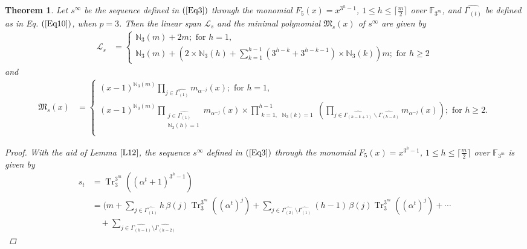 \documentclass[pdflatex,sn-mathphys-num]{sn-jnl}%
\theoremstyle{thmstyleone}%
\newtheorem{theorem}{Theorem}%
\theoremstyle{thmstyletwo}%
\theoremstyle{thmstylethree}%
\begin{document}
\begin{theorem}\label{Th3}
    Let $s^{\infty}$ be the sequence defined in $(\ref{Eq3})$ through the monomial $F_{5}(x)=x^{3^h-1}$, $1\leq h\leq\lceil\frac{m}{2}\rceil$ over $\mathbb{F}_{3^m}$, and $\widehat{\Gamma_{(t)}}$ be defined as in Eq. $(\ref{Eq10})$, when $p=3$. Then the linear span $\mathcal{L}_{s}$ and the minimal polynomial $\mathfrak{M}_{s}(x)$ of $s^{\infty}$ are given by
    \begin{align*}
        \mathcal{L}_{s} &=\begin{cases}
            \mathbb{N}_{3}(m)+2m;\text{ for }h=1, \\
            \mathbb{N}_{3}(m)+\left(2\times\mathbb{N}_{3}(h)+\sum_{k=1}^{h-1}(3^{h-k}+3^{h-k-1})\times\mathbb{N}_{3}(k)\right) m;\text{ for }h\geq 2
        \end{cases}    
    \end{align*}
    and
    \begin{align*}
        \mathfrak{M}_{s}(x) &= \begin{cases}
            (x-1)^{\mathbb{N}_{3}(m)}\prod_{j\in\widehat{\Gamma_{(1)}}}m_{\alpha^{-j}}(x);\text{ for }h=1, \\
            (x-1)^{\mathbb{N}_{3}(m)}\prod_{\substack{j\in\widehat{\Gamma_{(1)}}\\\mathbb{N}_{3}(h)=1}}m_{\alpha^{-j}}(x)\times \prod_{\substack{k=1,\text{ }\mathbb{N}_{3}(k)=1}}^{h-1}\left(\prod_{j\in\widehat{\Gamma_{(h-k+1)}}\backslash\widehat{\Gamma_{(h-k)}}}m_{\alpha^{-j}}(x)\right);\text{ for }h\geq 2. \\
        \end{cases}
    \end{align*}
    \begin{proof}
        With the aid of Lemma $\ref{L12}$, the sequence $s^{\infty}$ defined in $(\ref{Eq3})$ through the monomial $F_{5}(x)=x^{3^h-1}$, $1\leq h\leq\lceil\frac{m}{2}\rceil$ over $\mathbb{F}_{3^m}$ is given by 
        \begin{align}\label{Eq14}
           s_{t}&= \operatorname{Tr}_{3}^{3^m}\left((\alpha^{t}+1)^{3^{h}-1}\right) \nonumber \\ 
&=
\Biggl(
    m
    + \sum_{j\in\widehat{\Gamma_{(1)}}}
        h\,\beta(j)\operatorname{Tr}_{3}^{3^m}\left((\alpha^{t})^{j}\right) 
    + \sum_{j\in\widehat{\Gamma_{(2)}}\setminus\widehat{\Gamma_{(1)}}}
        (h-1)\,\beta(j)\operatorname{Tr}_{3}^{3^m}\left((\alpha^{t})^{j}\right)
    + \cdots \nonumber \\
&\quad
    + \sum_{j\in\widehat{\Gamma_{(h-1)}}\setminus\widehat{\Gamma_{(h-2)}}}

\end{align}
\end{proof}
\end{theorem}
\end{document}
